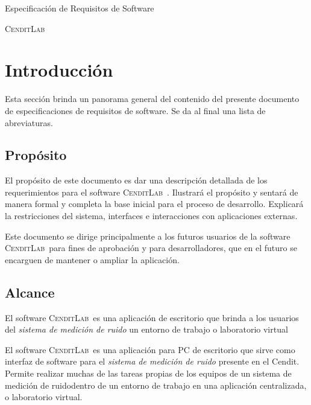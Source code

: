\documentclass[paper=letter,oneside,fontsize=12pt, parskip=full]{scrartcl}
\newcommand{\AppName}{\textsc{CenditLab}\ }
\newcommand{\smr}{sistema de medición de ruido}
\newcommand{\cendit}{Cendit}
\begin{document}
	
	\begin{titlepage}
				
		\begin{center}	
			
			\vspace{10cm}
			
			\begin{Large}			
				Especificación de Requisitos de Software
			\end{Large}
		
			\begin{Huge}
				\textsc{\AppName}
			\end{Huge}
			
		\end{center}
		
	\end{titlepage}

	\tableofcontents
	
	\section{Introducción}
	Esta sección brinda un panorama general del contenido del presente documento de especificaciones de requisitos de software. Se da al final una lista de abreviaturas.
	
	\subsection{Propósito}
	El propósito de este documento es dar una descripción detallada de los requerimientos para el software \AppName. Ilustrará el propósito y sentará de manera formal y completa la base inicial para el proceso de desarrollo. Explicará la restricciones del sistema, interfaces e interacciones con aplicaciones externas. 
	
	Este documento se dirige principalmente a los futuros usuarios de la software \AppName para fines de aprobación y para desarrolladores, que en el futuro se encarguen de mantener o ampliar la aplicación.
	
	\subsection{Alcance}
	
	El software \AppName es una aplicación de escritorio que brinda a los usuarios del \emph{\smr} un entorno de trabajo o laboratorio virtual 
	
	El software \AppName es una aplicación para PC de escritorio que sirve como interfaz de software para el \emph{\smr} presente en el \cendit. Permite realizar muchas de las tareas propias de los equipos de un \smr dentro de un entorno de trabajo en una aplicación centralizada, o laboratorio virtual. 
	
\end{document}
